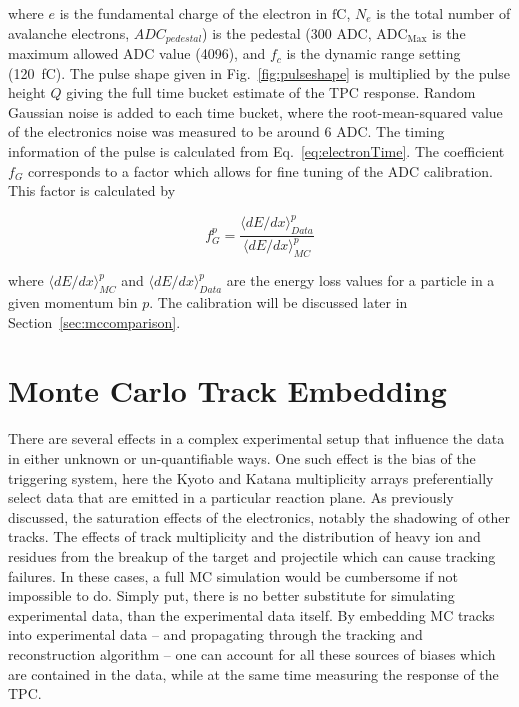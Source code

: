 where $e$ is the fundamental charge of the electron in $\si{\femto \coulomb}$, $N_{e}$ is the total number of avalanche electrons, $ADC_{pedestal}$) is the pedestal (300 ADC, $\mathrm{ADC_{Max}}$ is the maximum allowed ADC value (4096), and $f_c$ is the dynamic range setting (\SI{120}{\femto\coulomb}). The pulse shape given in Fig.~\ref{fig:pulseshape} is multiplied by the pulse height $Q$ giving the full time bucket estimate of the TPC response. Random Gaussian noise is added to each time bucket, where the root-mean-squared value of the electronics noise was measured to be around 6 ADC. The timing information of the pulse is calculated from Eq.~\ref{eq:electronTime}. The coefficient $f_G$ corresponds to a factor which allows for fine tuning of the ADC calibration. This factor is calculated by

\begin{equation}
f_G^p = \frac{\langle dE/dx\rangle_{Data}^p}{\langle dE/dx\rangle_{MC}^p}
\label{eq:dedxcalibration}
\end{equation}

where $\langle dE/dx\rangle_{MC}^p$ and $\langle dE/dx\rangle_{Data}^p$  are the energy loss values for a particle in a given momentum bin $p$. The calibration will be discussed later in Section~\ref{sec:mccomparison}.


\section{Monte Carlo Track Embedding}
\label{sec:embedding}

There are several effects in a complex experimental setup that influence the data in either unknown or un-quantifiable ways. One such effect is the bias of the triggering system, here the Kyoto and Katana multiplicity arrays preferentially select data that are emitted in a particular reaction plane. As previously discussed, the saturation effects of the electronics, notably the shadowing of other tracks. The effects of track multiplicity and the distribution of heavy ion and residues from the breakup of the target and projectile which can cause tracking failures. In these cases, a full MC simulation would be cumbersome if not impossible to do. Simply put, there is no better substitute for simulating experimental data, than the experimental data itself. By embedding MC tracks into experimental data -- and propagating through the tracking and reconstruction algorithm -- one can account for all these sources of biases which are contained in the data, while at the same time measuring the response of the TPC.

